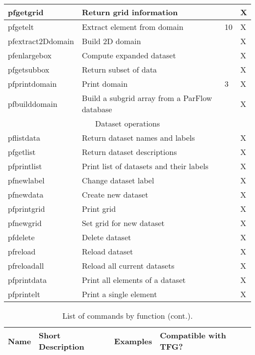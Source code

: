 {\begin{table}
\begin{tabular}{ | p{3cm} | p{6cm} | p{2cm} | p{3cm} | }
	pfgetgrid & Return grid information &  & X \\ \hline
	pfgetelt & Extract element from domain & 10 & X \\ \hline
	pfextract2Ddomain & Build 2D domain &  & X \\ \hline
	pfenlargebox & Compute expanded dataset &  & X \\ \hline
	pfgetsubbox & Return subset of data &  & X \\ \hline
	pfprintdomain & Print domain & 3 & X \\ \hline
	pfbuilddomain & Build a subgrid array from a ParFlow database &  & X \\ \hline
	\multicolumn{4}{|c|}{Dataset operations} \\ \hline
	pflistdata & Return dataset names and labels &  & X \\ \hline
	pfgetlist & Return dataset descriptions &  & X \\ \hline
	pfprintlist & Print list of datasets and their labels &  & X \\ \hline
	pfnewlabel & Change dataset label &  & X \\ \hline
	pfnewdata & Create new dataset &  & X \\ \hline
	pfprintgrid & Print grid &  & X \\ \hline
	pfnewgrid & Set grid for new dataset &  & X \\ \hline
	pfdelete & Delete dataset &  & X \\ \hline
	pfreload & Reload dataset &  & X \\ \hline
	pfreloadall & Reload all current datasets &  & X \\ \hline
	pfprintdata & Print all elements of a dataset &  & X \\ \hline
	pfprintelt & Print a single element &  & X \\ \hline
\end{tabular}
\label{pftools2}
\end{table}


\begin{table} \center
\caption{List of \pftools{} commands by function (cont.).}

\begin{tabular}{ | p{3cm} | p{6cm} | p{2cm} | p{3cm} | }
\hline
	\bf{Name} & \bf{Short Description} & \bf{Examples} & \bf{Compatible with TFG?} \\ \hline


\end{tabular}
\end{table}}
